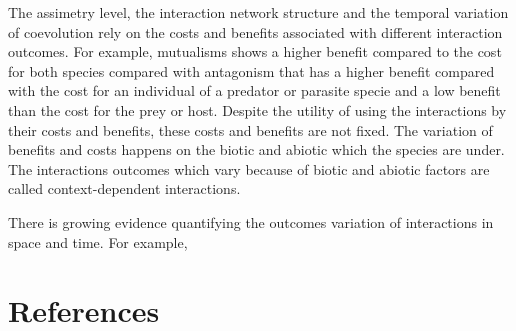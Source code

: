 \documentclass[a4paper, 12pt]{article}
\begin{document}
\par The assimetry level, the interaction network structure and the temporal variation of coevolution rely on the costs and benefits associated with different interaction outcomes.
For example, mutualisms shows a higher benefit compared to the cost for both species compared with antagonism that has a higher benefit compared with the cost for an individual of a predator or parasite specie and a low benefit than the cost for the prey or host.
Despite the utility of using the interactions by their costs and benefits, these costs and benefits are not fixed.
The variation of benefits and costs happens on the biotic and abiotic which the species are under.
The interactions outcomes which vary because of biotic and abiotic factors are called context-dependent interactions.

\par There is growing evidence quantifying the outcomes variation of interactions in space and time.
For example, 

\section{References}
\end{document}
